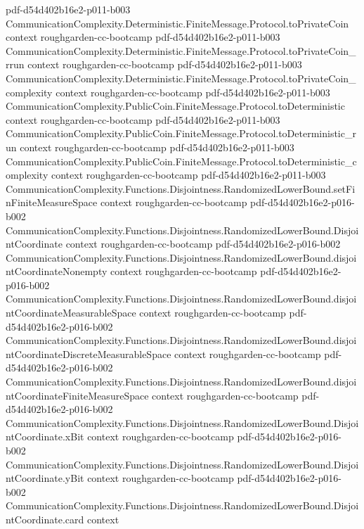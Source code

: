 \begin{theorem}
  {pdf-d54d402b16e2-p011-b003}
\proofstep
  {CommunicationComplexity.Deterministic.FiniteMessage.Protocol.toPrivateCoin}
  {context}
  {roughgarden-cc-bootcamp}
  {pdf-d54d402b16e2-p011-b003}
\proofstep
  {CommunicationComplexity.Deterministic.FiniteMessage.Protocol.toPrivateCoin_rrun}
  {context}
  {roughgarden-cc-bootcamp}
  {pdf-d54d402b16e2-p011-b003}
\proofstep
  {CommunicationComplexity.Deterministic.FiniteMessage.Protocol.toPrivateCoin_complexity}
  {context}
  {roughgarden-cc-bootcamp}
  {pdf-d54d402b16e2-p011-b003}
\proofstep
  {CommunicationComplexity.PublicCoin.FiniteMessage.Protocol.toDeterministic}
  {context}
  {roughgarden-cc-bootcamp}
  {pdf-d54d402b16e2-p011-b003}
\proofstep
  {CommunicationComplexity.PublicCoin.FiniteMessage.Protocol.toDeterministic_run}
  {context}
  {roughgarden-cc-bootcamp}
  {pdf-d54d402b16e2-p011-b003}
\proofstep
  {CommunicationComplexity.PublicCoin.FiniteMessage.Protocol.toDeterministic_complexity}
  {context}
  {roughgarden-cc-bootcamp}
  {pdf-d54d402b16e2-p011-b003}
\proofstep
  {CommunicationComplexity.Functions.Disjointness.RandomizedLowerBound.setFinFiniteMeasureSpace}
  {context}
  {roughgarden-cc-bootcamp}
  {pdf-d54d402b16e2-p016-b002}
\proofstep
  {CommunicationComplexity.Functions.Disjointness.RandomizedLowerBound.DisjointCoordinate}
  {context}
  {roughgarden-cc-bootcamp}
  {pdf-d54d402b16e2-p016-b002}
\proofstep
  {CommunicationComplexity.Functions.Disjointness.RandomizedLowerBound.disjointCoordinateNonempty}
  {context}
  {roughgarden-cc-bootcamp}
  {pdf-d54d402b16e2-p016-b002}
\proofstep
  {CommunicationComplexity.Functions.Disjointness.RandomizedLowerBound.disjointCoordinateMeasurableSpace}
  {context}
  {roughgarden-cc-bootcamp}
  {pdf-d54d402b16e2-p016-b002}
\proofstep
  {CommunicationComplexity.Functions.Disjointness.RandomizedLowerBound.disjointCoordinateDiscreteMeasurableSpace}
  {context}
  {roughgarden-cc-bootcamp}
  {pdf-d54d402b16e2-p016-b002}
\proofstep
  {CommunicationComplexity.Functions.Disjointness.RandomizedLowerBound.disjointCoordinateFiniteMeasureSpace}
  {context}
  {roughgarden-cc-bootcamp}
  {pdf-d54d402b16e2-p016-b002}
\proofstep
  {CommunicationComplexity.Functions.Disjointness.RandomizedLowerBound.DisjointCoordinate.xBit}
  {context}
  {roughgarden-cc-bootcamp}
  {pdf-d54d402b16e2-p016-b002}
\proofstep
  {CommunicationComplexity.Functions.Disjointness.RandomizedLowerBound.DisjointCoordinate.yBit}
  {context}
  {roughgarden-cc-bootcamp}
  {pdf-d54d402b16e2-p016-b002}
\proofstep
  {CommunicationComplexity.Functions.Disjointness.RandomizedLowerBound.DisjointCoordinate.card}
  {context}

\end{theorem}
